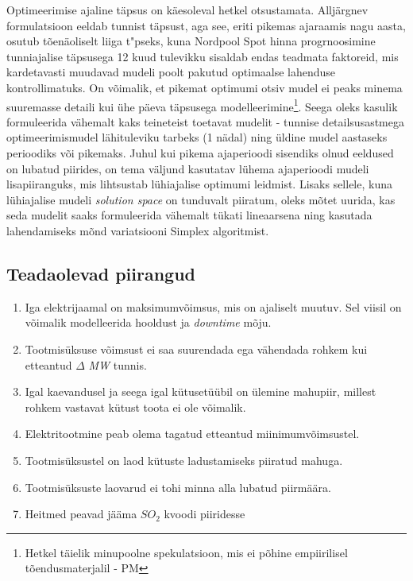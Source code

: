 \documentclass[twosided, 10pt, a4paper]{article}
\begin{document}
Optimeerimise ajaline t\"apsus on k\"aesoleval hetkel otsustamata. Allj\"argnev formulatsioon eeldab tunnist t\"apsust, aga see, eriti pikemas ajaraamis nagu aasta, osutub t\~oen\"aoliselt liiga t\a"pseks, kuna Nordpool Spot hinna progrnoosimine tunniajalise t\"apsusega 12 kuud tulevikku sisaldab endas teadmata faktoreid, mis kardetavasti muudavad mudeli poolt pakutud optimaalse lahenduse kontrollimatuks. On v\~oimalik, et pikemat optimumi otsiv mudel ei peaks minema suuremasse detaili kui \"uhe p\"aeva t\"apsusega modelleerimine\footnote{Hetkel t\"aielik minupoolne spekulatsioon, mis ei p\~ohine empiirilisel t\~oendusmaterjalil - PM}. Seega oleks kasulik formuleerida v\"ahemalt kaks teineteist toetavat mudelit - tunnise detailsusastmega optimeerimismudel l\"ahituleviku tarbeks (1 n\"adal) ning \"uldine mudel aastaseks perioodiks v\~oi pikemaks. Juhul kui pikema ajaperioodi sisendiks olnud eeldused on lubatud piirides, on tema v\"aljund kasutatav l\"uhema ajaperioodi mudeli lisapiiranguks, mis lihtsustab l\"uhiajalise optimumi leidmist. Lisaks sellele, kuna l\"uhiajalise mudeli \emph{solution space} on tunduvalt piiratum, oleks m\~otet uurida, kas seda mudelit saaks formuleerida v\"ahemalt t\"ukati lineaarsena ning kasutada lahendamiseks m\~ond variatsiooni Simplex algoritmist.

\subsection{Teadaolevad piirangud}
\begin{enumerate}
\item Iga elektrijaamal on maksimumv\~oimsus, mis on ajaliselt muutuv. Sel viisil on v\~oimalik modelleerida hooldust ja \emph{downtime} m\~oju.
\item Tootmis\"uksuse v\~oimsust ei saa suurendada ega v\"ahendada rohkem kui etteantud $\Delta$ \emph{MW} tunnis. 
\item Igal kaevandusel ja seega igal k\"utuset\"u\"ubil on \"ulemine mahupiir, millest rohkem vastavat k\"utust toota ei ole v\~oimalik.
\item Elektritootmine peab olema tagatud etteantud miinimumv\~oimsustel.
\item Tootmis\"uksustel on laod k\"utuste ladustamiseks piiratud mahuga.
\item Tootmis\"uksuste laovarud ei tohi minna alla lubatud piirm\"a\"ara.
\item Heitmed peavad j\"a\"ama $SO_2$ kvoodi piiridesse
\end{enumerate}
\end{document}
